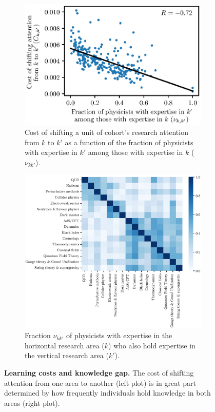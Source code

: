 \documentclass{article}
\begin{document}
\begin{figure}[H]
\begin{subfigure}{.45\textwidth}
    \centering
    \includegraphics[width=1.15\textwidth]{Fig14a.eps}
    \caption{Cost of shifting a unit of cohort's research attention from $k$ to $k'$ as a function of the fraction of physicists with expertise in $k'$ among those with expertise in $k$ ($\nu_{kk'}$).}
    \label{fig:cost_knowledge}
\end{subfigure}\hfill%
\begin{subfigure}{0.45\textwidth}
    \centering
    \includegraphics[width=1.15\textwidth]{Fig14b.eps}
    \caption{Fraction $\nu_{kk'}$ of physicists with expertise in the horizontal research area ($k$) who also hold expertise in the vertical research area ($k'$).}
    \label{fig:nu}
\end{subfigure}
\caption{\textbf{Learning costs and knowledge gap.} The cost of shifting attention from one area to another (left plot) is in great part determined by how frequently individuals hold knowledge in both areas (right plot).}
\label{fig:knowledge}
\end{figure}
\end{document}
